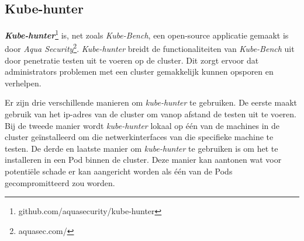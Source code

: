 \subsection{Kube-hunter}

\textbf{\textit{Kube-hunter}}\footnote{github.com/aquasecurity/kube-hunter} is, net zoals \textit{Kube-Bench}, een open-source applicatie gemaakt is door \textit{Aqua Security}\footnote{aquasec.com/}. \textit{Kube-hunter} breidt de functionaliteiten van \textit{Kube-Bench} uit door penetratie testen uit te voeren op de cluster. Dit zorgt ervoor dat administrators problemen met een cluster gemakkelijk kunnen opsporen en verhelpen.

Er zijn drie verschillende manieren om \textit{kube-hunter} te gebruiken. De eerste maakt gebruik van het ip-adres van de cluster om vanop afstand de testen uit te voeren. Bij de tweede manier wordt \textit{kube-hunter} lokaal op één van de machines in de cluster geïnstalleerd om die netwerkinterfaces van die specifieke machine te testen. De derde en laatste manier om \textit{kube-hunter} te gebruiken is om het te installeren in een Pod binnen de cluster. Deze manier kan aantonen wat voor potentiële schade er kan aangericht worden als één van de Pods gecompromitteerd zou worden.
